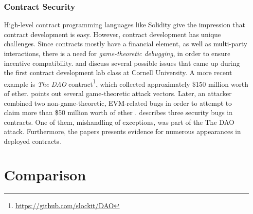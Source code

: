 \subsubsection{Contract Security}

High-level contract programming languages like Solidity give the impression that contract development is easy. However, contract development has unique challenges. Since contracts mostly have a financial element, as well as multi-party interactions, there is a need for \emph{game-theoretic debugging}, in order to ensure incentive compatibility. \cite{delmolino2015programmer} and \cite{delmolino2015step} discuss several possible issues that came up during the first contract development lab class at Cornell University. A more recent example is \emph{The DAO} contract\footnote{\url{https://github.com/slockit/DAO}}, which collected approximately \$150 million worth of ether. \cite{mark2016} points out several game-theoretic attack vectors. Later, an attacker combined two non-game-theoretic, \ac{EVM}-related bugs in order to attempt to claim more than \$50 million worth of ether \parencite{daian2016dao}. \cite{cryptoeprint:2016:633} describes three security bugs in contracts. One of them, mishandling of exceptions, was part of the The DAO attack. Furthermore, the papers presents evidence for numerous appearances in deployed contracts.


\section{Comparison}

